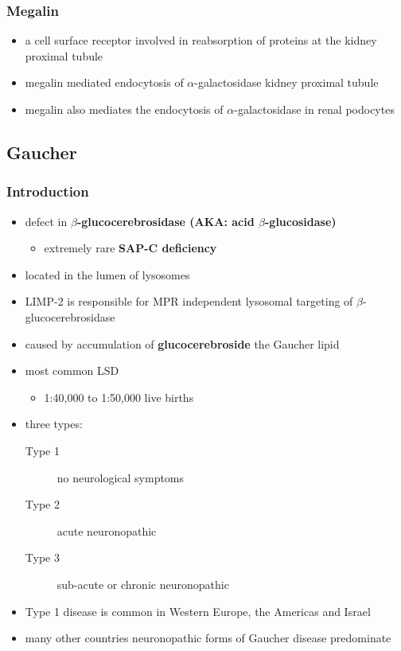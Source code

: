 \documentclass[12pt]{scrartcl}
\begin{document}
\subsubsection{Megalin}
\label{sec:org065b7b9}
\begin{itemize}
\item a cell surface receptor involved in reabsorption of proteins at the kidney proximal tubule
\item megalin mediated endocytosis of \(\alpha\)-galactosidase kidney proximal tubule
\item megalin also mediates the endocytosis of \(\alpha\)-galactosidase in renal podocytes
\end{itemize}

\subsection{Gaucher}
\label{sec:org11eef75}
\subsubsection{Introduction}
\label{sec:org990c94e}
\begin{itemize}
\item defect in \textbf{\(\beta\)-glucocerebrosidase (AKA: acid \(\beta\)-glucosidase)}
\begin{itemize}
\item extremely rare \textbf{SAP-C deficiency}
\end{itemize}
\item located in the lumen of lysosomes
\item LIMP-2 is responsible for MPR independent lysosomal targeting of
\(\beta\)-glucocerebrosidase
\item caused by accumulation of \textbf{glucocerebroside} the Gaucher lipid
\item most common LSD
\begin{itemize}
\item 1:40,000 to 1:50,000 live births
\end{itemize}
\item three types:
\begin{description}
\item[{Type 1}] no neurological symptoms
\item[{Type 2}] acute neuronopathic
\item[{Type 3}] sub-acute or chronic neuronopathic
\end{description}
\item Type 1 disease is common in Western Europe, the Americas and Israel
\item many other countries neuronopathic forms of Gaucher disease predominate
\end{itemize}
\end{document}
